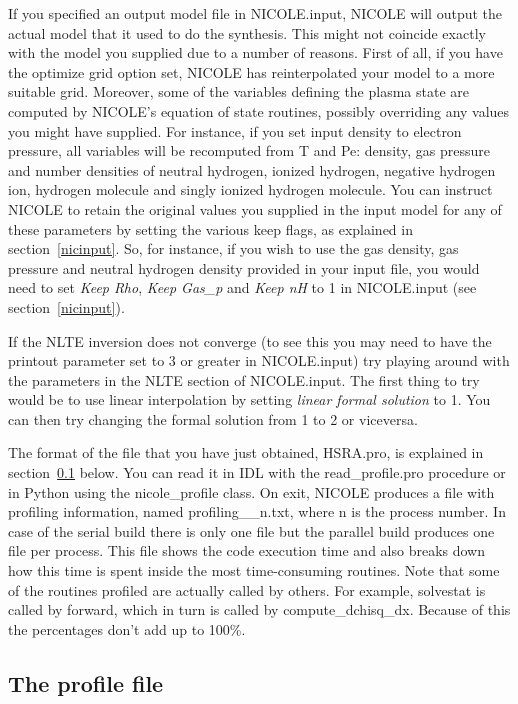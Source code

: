 If you specified an output model file in NICOLE.input, NICOLE will
output the actual model that it used to do the synthesis. This might
not coincide exactly with the model you supplied due to a number of
reasons. First of all, if you have the optimize grid option set,
NICOLE has reinterpolated your model to a more suitable
grid. Moreover, some of the variables defining the plasma state are
computed by NICOLE's equation of state routines, possibly overriding any values
you might have supplied. For instance, if you set input density to
electron pressure, all variables will be recomputed from T and Pe:
density, gas pressure and number densities of neutral hydrogen,
ionized hydrogen, negative hydrogen ion, hydrogen molecule and singly
ionized hydrogen molecule. You can instruct NICOLE to retain the
original values you supplied in the input model for any of these
parameters by setting the various keep flags, as explained in
section~\ref{nicinput}. So, for instance, if you wish to use the gas
density, gas pressure and neutral hydrogen density provided in your
input file, you would need to set {\em Keep Rho}, {\em Keep Gas\_p}
and {\em Keep nH} to 1 in NICOLE.input (see section~\ref{nicinput}).

If the NLTE inversion does not converge (to see this you may need to
have the printout parameter set to 3 or greater in NICOLE.input) try
playing around with the parameters in the NLTE section of
NICOLE.input. The first thing to try would be to use linear
interpolation by setting {\em linear formal solution} to 1. You can
then try changing the formal solution from 1 to 2 or viceversa.

The format of the file that you have just obtained, HSRA.pro, is
explained in section~\ref{profilefile} below. You can read it in IDL
with the read\_profile.pro procedure or in Python using the
nicole\_profile class. On exit, NICOLE produces a file with profiling
information, named profiling\_\_n.txt, where n is the process
number. In case of the serial build there is only one file but the
parallel build produces one file per process. This file shows the code
execution time and also breaks down how this time is spent inside the
most time-consuming routines. Note that some of the routines profiled
are actually called by others. For example, solvestat is called by
forward, which in turn is called by compute\_dchisq\_dx. Because of
this the percentages don't add up to 100\%.

\subsection{The profile file}
\label{profilefile}

